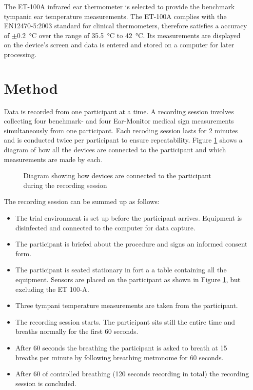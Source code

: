 \medskip

The ET-100A infrared ear thermometer is selected to provide the benchmark tympanic ear temperature measurements. The ET-100A complies with the EN12470-5:2003 standard for clinical thermometers, therefore satisfies a accuracy of $\pm$\SI{0.2}{\celsius} over the range of \SI{35.5}{\celsius} to \SI{42}{\celsius}. Its measurements are displayed on the device's screen and data is entered and stored on a computer for later processing.


\section{Method}
Data is recorded from one participant at a time. A recording session involves collecting four benchmark- and four Ear-Monitor medical sign measurements simultaneously from one participant. Each recoding session lasts for 2 minutes and is conducted twice per participant to ensure repeatability. Figure \ref{fig:SetUp} shows a diagram of how all the devices are connected to the participant and which measurements are made by each.

\begin{figure}[H]
\centering
\graphicspath{{figs/}}

\caption{Diagram showing how devices are connected to the participant during the recording session}
\label{fig:SetUp}
\end{figure}

The recording session can be summed up as follows:

\begin{itemize}
\item The trial environment is set up before the participant arrives. Equipment is disinfected and connected to the computer for data capture. 
\item The participant is briefed about the procedure and signs an informed consent form.
\item The participant is seated stationary in fort a a table containing all the equipment. Sensors are placed on the participant as shown in Figure \ref{fig:SetUp}, but excluding the ET 100-A.
\item Three tympani temperature measurements are taken from the participant.
\item The recording session starts. The participant sits still the entire time and breaths normally for the first 60 seconds.
\item After 60 seconds the breathing the participant is asked to breath at 15 breaths per minute by following breathing metronome for 60 seconds.
\item After 60 of controlled breathing (120 seconds recording in total) the recording session is concluded.

\end{itemize}





